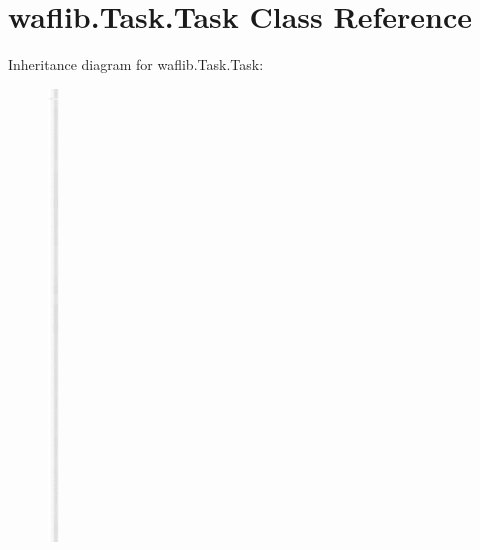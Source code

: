 \hypertarget{classwaflib_1_1_task_1_1_task}{}\section{waflib.\+Task.\+Task Class Reference}
\label{classwaflib_1_1_task_1_1_task}
Inheritance diagram for waflib.\+Task.\+Task\+:\begin{figure}[H]
\begin{center}
\leavevmode
\includegraphics[height=12.000000cm]{classwaflib_1_1_task_1_1_task}
\end{center}
\end{figure}
